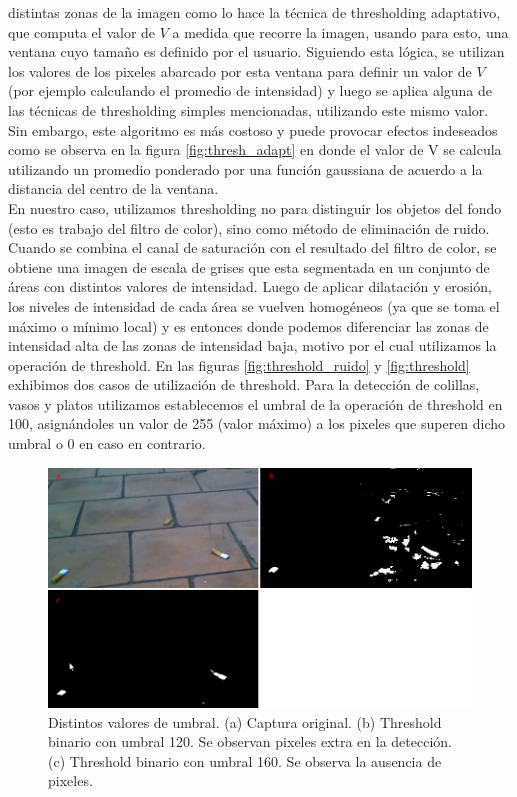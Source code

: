 distintas zonas de la imagen como lo hace la 
técnica de thresholding adaptativo, que computa el valor de $V$ a 
medida que recorre la imagen, usando para esto, una ventana cuyo 
tamaño es definido por el usuario. Siguiendo esta lógica, se utilizan 
los valores de los pixeles abarcado por esta ventana para definir un valor 
de $V$ (por ejemplo calculando el promedio de intensidad) y luego se 
aplica alguna de las técnicas de thresholding simples mencionadas, 
utilizando este mismo valor. Sin embargo, este algoritmo es más 
costoso y puede provocar efectos indeseados como se observa en la 
figura \ref{fig:thresh_adapt} en donde el valor de V se calcula 
utilizando un promedio ponderado por una función gaussiana de acuerdo a la distancia del centro 
de la ventana.\\
\indent En nuestro caso, utilizamos thresholding no para distinguir los 
objetos del fondo (esto es trabajo del filtro de color), sino como 
método de eliminación de ruido. Cuando se combina el canal de 
saturación con el resultado del filtro de color, se obtiene una imagen 
de escala de grises que esta segmentada en un conjunto de áreas con 
distintos valores de intensidad. Luego de aplicar dilatación y 
erosión, los niveles de intensidad de cada área se vuelven 
homogéneos (ya que se toma el máximo o mínimo local) y es entonces 
donde podemos diferenciar las zonas de intensidad alta de las zonas de 
intensidad baja, motivo por el cual utilizamos la operación de 
threshold. En las figuras \ref{fig:threshold_ruido} y 
\ref{fig:threshold} exhibimos dos casos de utilización de threshold. 
Para la detección de colillas, vasos y platos utilizamos establecemos 
el umbral de la operación de threshold en 100, asignándoles un valor 
de 255 (valor máximo) a los pixeles que superen dicho umbral o 0 en 
caso en contrario. 
\begin{figure}[tpb]
\begin{center}
  \includegraphics[scale=0.4]{figuras/threshold-dif.png}
\end{center}
  \caption{\small Distintos valores de umbral. (a) Captura original. 
  (b) Threshold binario con umbral 120. Se observan pixeles extra en 
  la detección. (c) Threshold binario con umbral 160. Se observa la 
  ausencia de pixeles. }
  \label{fig:thresh-dif}
\end{figure}

